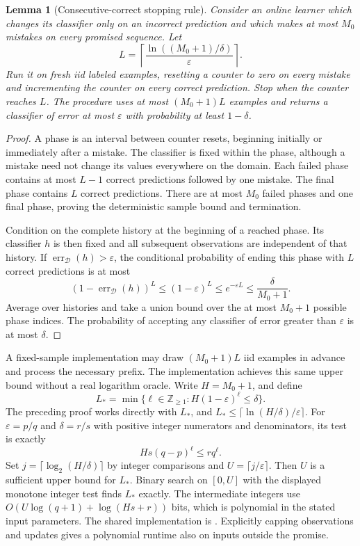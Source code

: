 \documentclass[11pt,a4paper]{article}
\newtheorem{lemma}[theorem]{Lemma}
\theoremstyle{remark}
\newcommand{\err}{\operatorname{err}}
\newcommand{\1}{\mathbf 1}
\begin{document}
\begin{lemma}[Consecutive-correct stopping rule]\label{lem:streak}
Consider an online learner which changes its classifier only on an incorrect
prediction and which makes at most $M_0$ mistakes on every promised sequence.
Let
\[
 L=\left\lceil\frac{\ln((M_0+1)/\delta)}{\varepsilon}\right\rceil.
\]
Run it on fresh iid labeled examples, resetting a counter to zero on every
mistake and incrementing the counter on every correct prediction. Stop when
the counter reaches $L$. The procedure uses at most $(M_0+1)L$ examples and
returns a classifier of error at most $\varepsilon$ with probability at least
$1-\delta$.
\end{lemma}
\begin{proof}
A phase is an interval between counter resets, beginning initially or
immediately after a mistake. The classifier is fixed within the phase,
although a mistake need not change its values everywhere on the domain.
Each failed phase contains
at most $L-1$ correct predictions followed by one mistake. The final phase
contains $L$ correct predictions. There are at most $M_0$ failed phases and
one final phase, proving the deterministic sample bound and termination.

Condition on the complete history at the beginning of a reached phase. Its
classifier $h$ is then fixed and all subsequent observations are independent
of that history. If $\err_{\mathcal D}(h)>\varepsilon$, the conditional
probability of ending this phase with $L$ correct predictions is at most
\[
 (1-\err_{\mathcal D}(h))^L
 \le (1-\varepsilon)^L
 \le e^{-\varepsilon L}
 \le\frac{\delta}{M_0+1}.
\]
Average over histories and take a union bound over the at most $M_0+1$ possible
phase indices. The probability of accepting any classifier of error greater
than $\varepsilon$ is at most $\delta$.
\end{proof}

A fixed-sample implementation may draw $(M_0+1)L$ iid examples in advance and
process the necessary prefix. The implementation achieves this same upper
bound without a real logarithm oracle. Write $H=M_0+1$, and define
\begin{equation}\label{eq:exactstreak}
 L_* = \min\{\ell\in\mathbb Z_{\ge1}:H(1-\varepsilon)^\ell\le\delta\}.
\end{equation}
The preceding proof works directly with $L_*$, and
$L_*\le\lceil\ln(H/\delta)/\varepsilon\rceil$.
For $\varepsilon=p/q$ and $\delta=r/s$ with positive integer numerators and
denominators, its test is exactly
\[
 Hs(q-p)^\ell\le r q^\ell.
\]
Set $j=\lceil\log_2(H/\delta)\rceil$ by integer comparisons and
$U=\lceil j/\varepsilon\rceil$. Then $U$ is a sufficient upper bound for
$L_*$. Binary search on $[0,U]$ with the displayed monotone integer test
finds $L_*$ exactly. The intermediate integers use
$O(U\log(q+1)+\log(Hs+r))$ bits, which is polynomial in the stated input
parameters. The shared implementation is .
Explicitly capping observations and updates gives a polynomial runtime also
on inputs outside the promise.
\end{document}
